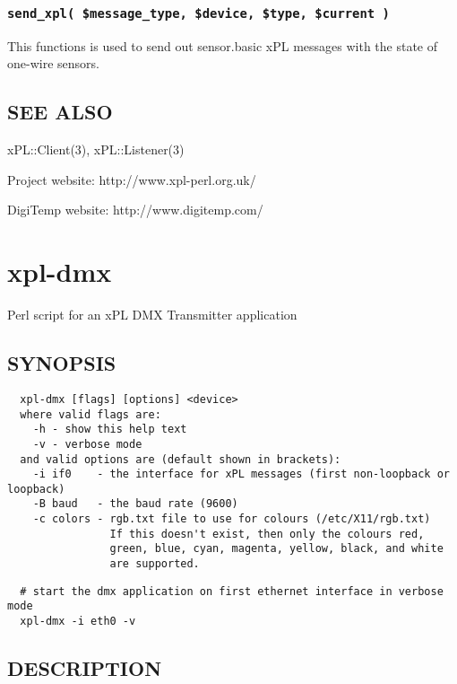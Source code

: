 \documentclass[12pt,a4paper]{article}
\begin{document}
\subsubsection*{\texttt{send\_xpl( \$message\_type, \$device, \$type, \$current )}\label{xpl-digitemp_send_xpl_message_type_device_type_current_}}


This functions is used to send out sensor.basic xPL messages with
the state of one-wire sensors.

\subsection*{SEE ALSO\label{xpl-digitemp_SEE_ALSO}}


xPL::Client(3), xPL::Listener(3)



Project website: http://www.xpl-perl.org.uk/



DigiTemp website: http://www.digitemp.com/

\newpage
\section{xpl-dmx\label{xpl-dmx}}


Perl script for an xPL DMX Transmitter application

\subsection*{SYNOPSIS\label{xpl-dmx_SYNOPSIS}}
\begin{verbatim}
  xpl-dmx [flags] [options] <device>
  where valid flags are:
    -h - show this help text
    -v - verbose mode
  and valid options are (default shown in brackets):
    -i if0    - the interface for xPL messages (first non-loopback or loopback)
    -B baud   - the baud rate (9600)
    -c colors - rgb.txt file to use for colours (/etc/X11/rgb.txt)
                If this doesn't exist, then only the colours red,
                green, blue, cyan, magenta, yellow, black, and white
                are supported.
\end{verbatim}
\begin{verbatim}
  # start the dmx application on first ethernet interface in verbose mode
  xpl-dmx -i eth0 -v
\end{verbatim}
\subsection*{DESCRIPTION\label{xpl-dmx_DESCRIPTION}}
\end{document}

